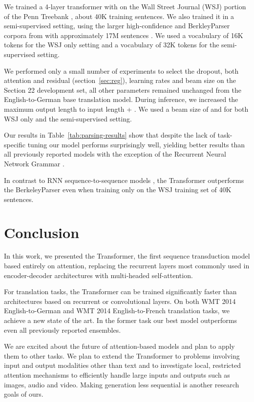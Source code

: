 \documentclass{article}
\begin{document}
We trained a 4-layer transformer with  on the Wall Street Journal (WSJ) portion of the Penn Treebank \citep{marcus1993building}, about 40K training sentences. We also trained it in a semi-supervised setting, using the larger high-confidence and BerkleyParser corpora from with approximately 17M sentences \citep{KVparse15}. We used a vocabulary of 16K tokens for the WSJ only setting and a vocabulary of 32K tokens for the semi-supervised setting.

We performed only a small number of experiments to select the dropout, both attention and residual (section~\ref{sec:reg}), learning rates and beam size on the Section 22 development set, all other parameters remained unchanged from the English-to-German base translation model. During inference, we increased the maximum output length to input length + . We used a beam size of  and  for both WSJ only and the semi-supervised setting.

Our results in Table~\ref{tab:parsing-results} show that despite the lack of task-specific tuning our model performs surprisingly well, yielding better results than all previously reported models with the exception of the Recurrent Neural Network Grammar \cite{dyer-rnng:16}.

In contrast to RNN sequence-to-sequence models \citep{KVparse15}, the Transformer outperforms the BerkeleyParser \cite{petrov-EtAl:2006:ACL} even when training only on the WSJ training set of 40K sentences.
 
\section{Conclusion}
In this work, we presented the Transformer, the first sequence transduction model based entirely on attention, replacing the recurrent layers most commonly used in encoder-decoder architectures with multi-headed self-attention.

For translation tasks, the Transformer can be trained significantly faster than architectures based on recurrent or convolutional layers. On both WMT 2014 English-to-German and WMT 2014 English-to-French translation tasks, we achieve a new state of the art. In the former task our best model outperforms even all previously reported ensembles. 

We are excited about the future of attention-based models and plan to apply them to other tasks. We plan to extend the Transformer to problems involving input and output modalities other than text and to investigate local, restricted attention mechanisms to efficiently handle large inputs and outputs such as images, audio and video.
Making generation less sequential is another research goals of ours.
\end{document}
